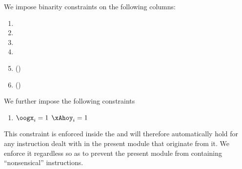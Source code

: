 We impose binarity constraints on the following columns:
\begin{multicols}{3}
	\begin{enumerate}
		\item \iomf{}
		\item \xAhoy{}
		\item \oogx{}
		\item[\vspace{\fill}]
		\item \first{} (\trash)
		\item \wcpRes{} (\trash)
	\end{enumerate}
\end{multicols}
\noindent We further impose the following constraints
\begin{enumerate}
	\item \If $\oogx _{i} = 1$ \Then $\xAhoy _{i} = 1$
\end{enumerate}
\saNote{}
This constraint is enforced inside the \hubMod{} and will therefore automatically hold for any instruction dealt with in the present module that originate from it.
We enforce it regardless so as to prevent the present module from containing ``nonsensical'' instructions.
